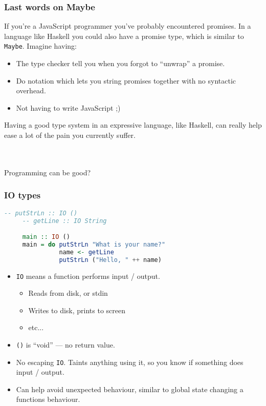 \documentclass{beamer}
\begin{document}
\begin{frame}
  \frametitle{Last words on Maybe}
  
  If you're a JavaScript programmer you've probably encountered
  promises. In a language like Haskell you could also have a promise
  type, which is similar to \texttt{Maybe}. Imagine having:

  \begin{itemize}
  \pause
  \item The type checker tell you when you forgot to ``unwrap'' a promise.
  \pause
  \item Do notation which lets you string promises together with no syntactic overhead.
  \pause
  \item Not having to write JavaScript ;)
  \end{itemize}

  Having a good type system in an expressive language, like Haskell,
  can really help ease a lot of the pain you currently suffer.

  \pause \\~\\

  Programming can be good?
\end{frame}

\begin{frame}[fragile]
  \frametitle{IO types}

  \begin{lstlisting}[frame=single, language=Haskell, breaklines=true, basicstyle=\ttfamily\tiny]
     -- putStrLn :: IO ()
     -- getLine :: IO String

     main :: IO ()
     main = do putStrLn "What is your name?"
               name <- getLine
               putStrLn ("Hello, " ++ name)
  \end{lstlisting}

  \begin{itemize}
  \item \texttt{IO} means a function performs input / output.
    \begin{itemize}
    \pause
    \item Reads from disk, or stdin
    \pause
    \item Writes to disk, prints to screen
    \pause
    \item etc...
    \end{itemize}
  \pause
  \item \texttt{()} is ``void'' --- no return value.
  \pause
  \item No escaping \texttt{IO}. Taints anything using it, so you know if something does input / output.
  \pause
  \item Can help avoid unexpected behaviour, similar to global state changing a functions behaviour.
  \end{itemize}
\end{frame}
\end{document}
